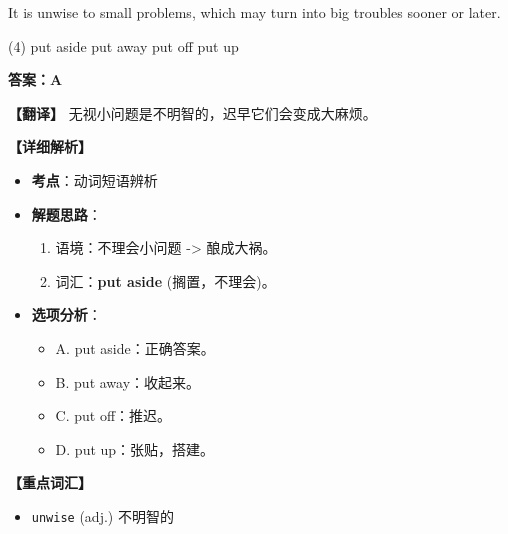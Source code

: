 \documentclass[11pt, a4paper]{article}
\newcommand{\analysis}[4]{
    \begin{solutionbox}
        \textbf{答案：#1}
        
        \textbf{【翻译】} #2
        
        \textbf{【详细解析】}
        #3
        
        \textbf{【重点词汇】}
        #4
    \end{solutionbox}
}
\newcommand{\blank}{\underline{\hspace{1.5cm}}}
\begin{document}
\begin{questions}
    \item It is unwise to \blank small problems, which may turn into big troubles sooner or later.
    \begin{tasks}(4)
        \task put aside \task put away \task put off \task put up
    \end{tasks}
    \analysis{A}{无视小问题是不明智的，迟早它们会变成大麻烦。}{
        \begin{itemize}
            \item \textbf{考点}：动词短语辨析
            \item \textbf{解题思路}：
                \begin{enumerate}
                    \item 语境：不理会小问题 -> 酿成大祸。
                    \item 词汇：\textbf{put aside} (搁置，不理会)。
                \end{enumerate}
            \item \textbf{选项分析}：
                \begin{itemize}
                    \item A. put aside：正确答案。
                    \item B. put away：收起来。
                    \item C. put off：推迟。
                    \item D. put up：张贴，搭建。
                \end{itemize}
        \end{itemize}
    }{
        \begin{itemize}
            \item \texttt{unwise} (adj.) 不明智的
        \end{itemize}
    }


\end{questions}
\end{document}
